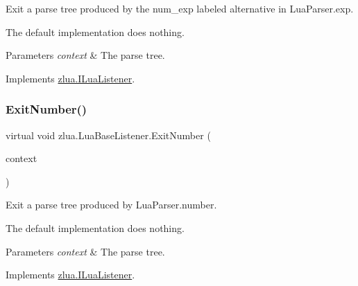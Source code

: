Exit a parse tree produced by the {\ttfamily num\+\_\+exp} labeled alternative in Lua\+Parser.\+exp. 

The default implementation does nothing.


\begin{DoxyParams}{Parameters}
{\em context} & The parse tree.\\
\hline
\end{DoxyParams}


Implements \mbox{\hyperlink{interfacezlua_1_1_i_lua_listener_ae345a5af97b04861ba3ce16cf1e33808}{zlua.\+I\+Lua\+Listener}}.

\mbox{\label{classzlua_1_1_lua_base_listener_a64548a4ec69a61b39e8a7c6d2f022e83}} 
\subsubsection{\texorpdfstring{Exit\+Number()}{ExitNumber()}}
{\footnotesize\ttfamily virtual void zlua.\+Lua\+Base\+Listener.\+Exit\+Number (\begin{DoxyParamCaption}\item[{\mbox{[}\+Not\+Null\mbox{]} \mbox{\hyperlink{classzlua_1_1_lua_parser_1_1_number_context}{Lua\+Parser.\+Number\+Context}}}]{context }\end{DoxyParamCaption})\hspace{0.3cm}{\ttfamily [virtual]}}



Exit a parse tree produced by Lua\+Parser.\+number. 

The default implementation does nothing.


\begin{DoxyParams}{Parameters}
{\em context} & The parse tree.\\
\hline
\end{DoxyParams}


Implements \mbox{\hyperlink{interfacezlua_1_1_i_lua_listener_a3c6fb2edc82e8e12e51ea539d512762b}{zlua.\+I\+Lua\+Listener}}.

\mbox{\label{classzlua_1_1_lua_base_listener_a01605f22d70f39a286e5c768e347e788}} 
